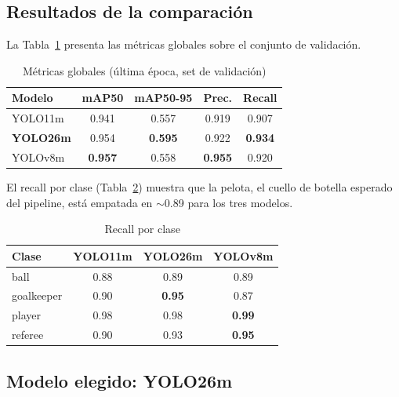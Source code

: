 \documentclass[conference]{IEEEtran}
\begin{document}
\subsection{Resultados de la comparación}

La Tabla~\ref{tab:global_metrics} presenta las métricas globales sobre el
conjunto de validación.

\begin{table}[htbp]
\caption{Métricas globales (última época, set de validación)}
\begin{center}
\begin{tabular}{lcccc}
\toprule
\textbf{Modelo} & \textbf{mAP50} & \textbf{mAP50-95} & \textbf{Prec.} & \textbf{Recall} \\
\midrule
YOLO11m & 0.941 & 0.557 & 0.919 & 0.907 \\
\textbf{YOLO26m} & 0.954 & \textbf{0.595} & 0.922 & \textbf{0.934} \\
YOLOv8m & \textbf{0.957} & 0.558 & \textbf{0.955} & 0.920 \\
\bottomrule
\end{tabular}
\label{tab:global_metrics}
\end{center}
\end{table}

El recall por clase (Tabla~\ref{tab:recall_clase}) muestra que la pelota,
el cuello de botella esperado del pipeline, está empatada en $\sim$0.89
para los tres modelos.

\begin{table}[htbp]
\caption{Recall por clase}
\begin{center}
\begin{tabular}{lccc}
\toprule
\textbf{Clase} & \textbf{YOLO11m} & \textbf{YOLO26m} & \textbf{YOLOv8m} \\
\midrule
ball & 0.88 & 0.89 & 0.89 \\
goalkeeper & 0.90 & \textbf{0.95} & 0.87 \\
player & 0.98 & 0.98 & \textbf{0.99} \\
referee & 0.90 & 0.93 & \textbf{0.95} \\
\bottomrule
\end{tabular}
\label{tab:recall_clase}
\end{center}
\end{table}

\subsection{Modelo elegido: YOLO26m}
\end{document}
